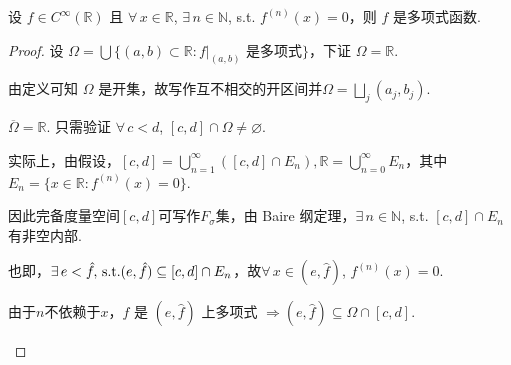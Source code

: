 \begin{theorem}
    设 $f \in C^\infty(\mathbb{R})$ 且 $\forall\, x \in \mathbb{R}$, $\exists\, n \in \mathbb{N}$, s.t. $f^{(n)}(x) = 0$，则 $f$ 是多项式函数.
\end{theorem}
\begin{proof}
    设 $\Omega = \bigcup\{(a, b) \subset \mathbb{R}: f|_{(a,b)} \text{ 是多项式}\}$，下证 $\Omega = \mathbb{R}$.\par
    由定义可知 $\Omega$ 是开集，故写作互不相交的开区间并$\Omega = \bigsqcup _j (a_j, b_j)$.\par
    \begin{claim}{$\overline{\Omega} = \mathbb{R}$.}
        只需验证 $\forall\, c < d$, $[c, d] \cap \Omega \neq \varnothing$.\par
    实际上，由假设，$ [c, d] = \bigcup_{n=1}^\infty ([c, d] \cap E_n),\mathbb{R}=\bigcup_{n=0}^\infty E_n$，其中 $E_n = \{x \in \mathbb{R}: f^{(n)}(x) = 0\}$.\par
    因此完备度量空间$[c,d]$可写作$F_\sigma$集，由 Baire 纲定理，$\exists\, n \in \mathbb{N}$, s.t. $[c, d] \cap E_n$ 有非空内部.\par
    也即，$\exists\, e < \hat{f},\operatorname{\,\text{s.t.}} (e, \hat{f}) \subseteq [c, d] \cap E_n$，故$\forall\, x \in (e, \hat{f})$, $f^{(n)}(x) = 0$.\par
    由于$n$不依赖于$x$，$f$ 是 $(e, \hat{f})$ 上多项式 $\Rightarrow (e, \hat{f}) \subseteq \Omega \cap [c, d]$.
    \end{claim}


\end{proof}
